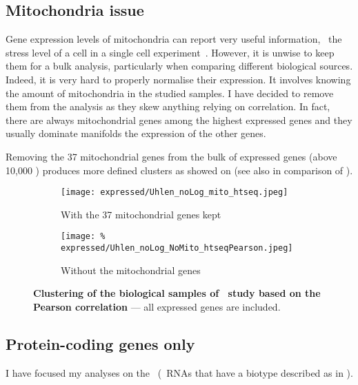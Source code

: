 \subsection{Mitochondria issue}\label{subsec:mito}

Gene expression levels of mitochondria can report very useful information,
\eg\ the stress level of a cell in a single cell experiment~.
However, it is unwise to keep them for a bulk analysis, particularly when
comparing different biological sources.
Indeed, it is very hard to properly normalise their expression.
It involves knowing the amount of mitochondria in the studied samples.
I have decided to remove them from the analysis as they skew anything relying
on correlation.
In fact, there are always mitochondrial genes among the highest expressed genes
and they usually dominate manifolds the expression of the other genes.

Removing the 37 mitochondrial genes from the bulk of expressed genes
(above 10,000 \pcgs) produces more defined clusters as showed on
 (see also  in comparison
of ).

\begin{figure}[!htbp]
    \centering
    \begin{subfigure}[hp]{0.85\textwidth}
        \centering
        \texttt{[image: expressed/Uhlen\_noLog\_mito\_htseq.jpeg]}
        \caption{With the 37 mitochondrial genes kept}\label{fig:withMito}
    \end{subfigure}

    \begin{subfigure}[hp]{0.85\textwidth}
        \centering
        \texttt{[image: \%
            expressed/Uhlen\_noLog\_NoMito\_htseqPearson.jpeg]}
        \caption{Without the mitochondrial genes}\label{fig:NoMito}
    \end{subfigure}
    \caption[Clustering of the biological samples of \uhlen\
    dataset based on the Pearson correlation]{\label{fig:MitoNomito}\textbf{Clustering
    of the biological samples of \uhlen\ study based on the Pearson correlation}
    --- all expressed genes are included.}
\end{figure}

\subsection{Protein-coding genes only}\label{subsec:protcodingOnly}
I have focused my analyses on the \mRNAs\ (\ie\ \glspl{RNA} that have a
biotype described as \emph{\pc} in \ens{76}).

